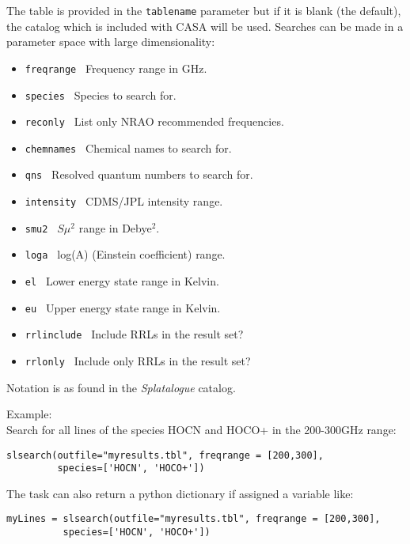 The table is provided in the {\tt tablename} parameter but if it is
blank (the default), the catalog which is included with CASA will be
used. Searches can be made in a parameter space with large
dimensionality: 

\begin{itemize}

\item {\tt freqrange     } Frequency range in GHz.
\item {\tt species       } Species to search for.
\item {\tt reconly       } List only NRAO recommended frequencies.
\item {\tt chemnames     } Chemical names to search for.
\item {\tt qns           } Resolved quantum numbers to search for.
\item {\tt intensity     } CDMS/JPL intensity range. 
\item {\tt smu2          } $S\mu^{2}$ range in Debye$^{2}$. 
\item {\tt loga          } log(A) (Einstein coefficient) range. 
\item {\tt el            } Lower energy state range in Kelvin. 
\item {\tt eu            } Upper energy state range in Kelvin.
\item {\tt rrlinclude    } Include RRLs in the result set?
\item {\tt rrlonly       } Include only RRLs in the result set?
\end{itemize}

Notation is as found in the {\it Splatalogue} catalog. 

Example:\\
Search for all lines of the species HOCN and HOCO+ in the 200-300GHz range:
\small
\begin{verbatim}
slsearch(outfile="myresults.tbl", freqrange = [200,300], 
         species=['HOCN', 'HOCO+'])
\end{verbatim}
\normalsize

The task can also return a python dictionary if assigned a variable
like:

\begin{verbatim}
myLines = slsearch(outfile="myresults.tbl", freqrange = [200,300], 
          species=['HOCN', 'HOCO+'])
\end{verbatim}
\normalsize





